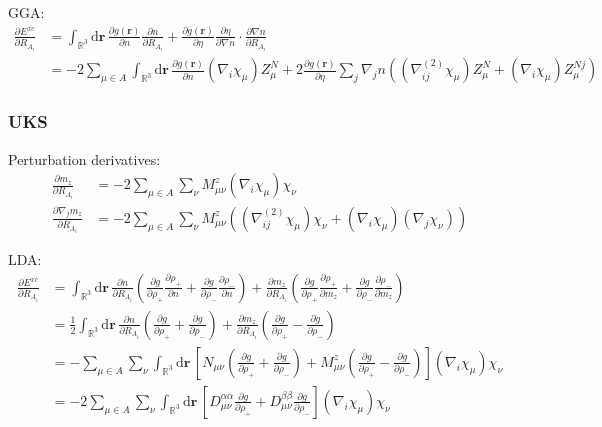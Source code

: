 \documentclass[11pt]{article}
\newcommand{\dd}[1]{\mathrm{d}{#1}\,}
\begin{document}
GGA:
\begin{align}
\frac{\partial E^{xc}}{\partial R_{A_i}} &= \int_{\mathbb{R}^3} \dd{\mathbf{r}} 
  \frac{\partial g(\mathbf{r})}{\partial n}   \frac{\partial n}   {\partial R_{A_i}} +
  \frac{\partial g(\mathbf{r})}{\partial \eta}\frac{\partial \eta}{\partial \nabla n} \cdot\frac{\partial \nabla n}{\partial R_{A_i}} \nonumber \\ 
&= -2\sum_{\mu\in A} 
   \int_{\mathbb{R}^3} \dd{\mathbf{r}} \frac{\partial g(\mathbf{r})}{\partial n} (\nabla_i \chi_\mu) Z^N_\mu +
   2\frac{\partial g(\mathbf{r})}{\partial \eta} \sum_j\nabla_j n \left( (\nabla^{(2)}_{ij}\chi_\mu) Z^N_\mu + (\nabla_i \chi_\mu) Z^{Nj}_\mu \right)
\end{align}


\subsubsection{UKS}
Perturbation derivatives:
\begin{align}
\frac{\partial m_z}{\partial R_{A_i}} &= -2\sum_{\mu\in A} \sum_\nu M^z_{\mu\nu} (\nabla_i \chi_\mu) \chi_\nu \\
\frac{\partial \nabla_j m_z}{\partial R_{A_i}} &= 
  -2\sum_{\mu\in A} \sum_\nu M^z_{\mu\nu} \left( (\nabla^{(2)}_{ij}\chi_\mu)\chi_\nu + (\nabla_i \chi_\mu)(\nabla_j \chi_\nu)\right) 
\end{align}

LDA:
\begin{align}
\frac{\partial E^{xc}}{\partial R_{A_i}} &= \int_{\mathbb{R}^3} \dd{\mathbf{r}} 
  \frac{\partial n}{\partial R_{A_i}}\left( \frac{\partial g}{\partial \rho_+}\frac{\partial\rho_+}{\partial n} +
    \frac{\partial g}{\partial \rho_-}\frac{\partial\rho_-}{\partial n} \right) +
  \frac{\partial m_z}{\partial R_{A_i}}\left( \frac{\partial g}{\partial \rho_+}\frac{\partial\rho_+}{\partial m_z} +
    \frac{\partial g}{\partial \rho_-}\frac{\partial\rho_-}{\partial m_z} \right) 
  \nonumber \\
&= \frac{1}{2}\int_{\mathbb{R}^3} \dd{\mathbf{r}} 
  \frac{\partial n}  {\partial R_{A_i}}\left( \frac{\partial g}{\partial \rho_+} + \frac{\partial g}{\partial \rho_-} \right) +
  \frac{\partial m_z}{\partial R_{A_i}}\left( \frac{\partial g}{\partial \rho_+} - \frac{\partial g}{\partial \rho_-} \right) 
  \nonumber \\
&= - \sum_{\mu\in A} \sum_\nu \int_{\mathbb{R}^3} \dd{\mathbf{r}}\left[ 
  N_{\mu\nu}  \left( \frac{\partial g}{\partial \rho_+} + \frac{\partial g}{\partial \rho_-} \right) +
  M^z_{\mu\nu}\left( \frac{\partial g}{\partial \rho_+} - \frac{\partial g}{\partial \rho_-} \right) 
  \right] (\nabla_i \chi_\mu) \chi_\nu \\
&= - 2\sum_{\mu\in A} \sum_\nu \int_{\mathbb{R}^3} \dd{\mathbf{r}}\left[ 
  D^{\alpha\alpha}_{\mu\nu} \frac{\partial g}{\partial \rho_+} +
  D^{\beta\beta}_{\mu\nu}   \frac{\partial g}{\partial \rho_-} 
  \right] (\nabla_i \chi_\mu) \chi_\nu
\end{align}
\end{document}
